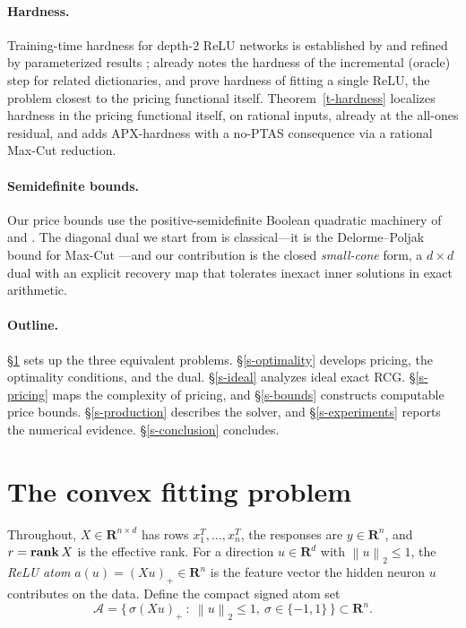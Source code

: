 \documentclass[12pt]{article}
\theoremstyle{plain}
\theoremstyle{definition}
\newcommand{\reals}{\mathbf{R}}
\newcommand{\A}{\mathcal{A}}
\newcommand{\norm}[1]{\left\lVert #1\right\rVert}
\newcommand{\relu}[1]{\left(#1\right)_+}
\newcommand{\rank}{\mathop{\bf rank}}
\begin{document}
\paragraph{Hardness.}
Training-time hardness for depth-2 ReLU networks is established by
\citet{goel2021tight} and refined by parameterized results
\citep{froese2022computational}; \citet{bach2017breaking} already notes the
hardness of the incremental (oracle) step for related dictionaries, and
\citet{boob2022complexity} prove hardness of fitting a single ReLU, the
problem closest to the pricing functional itself.
Theorem~\ref{t-hardness} localizes hardness in the pricing functional itself,
on rational inputs, already at the all-ones residual, and adds APX-hardness
with a no-PTAS consequence via a rational Max-Cut reduction.

\paragraph{Semidefinite bounds.}
Our price bounds use the positive-semidefinite Boolean quadratic machinery of
\citet{nesterov1998semidefinite} and \citet{goemans1995improved}. The diagonal
dual we start from is classical---it is the Delorme--Poljak bound for Max-Cut
\citep{delorme1993laplacian}---and our contribution is the closed
\emph{small-cone} form, a $d\times d$ dual with an explicit recovery map that
tolerates inexact inner solutions in exact arithmetic.

\paragraph{Outline.}
\S\ref{s-objective} sets up the three equivalent problems.
\S\ref{s-optimality} develops pricing, the optimality conditions, and the dual.
\S\ref{s-ideal} analyzes ideal exact RCG. \S\ref{s-pricing} maps the
complexity of pricing, and \S\ref{s-bounds} constructs computable price
bounds. \S\ref{s-production} describes the solver, and \S\ref{s-experiments}
reports the numerical evidence. \S\ref{s-conclusion} concludes.

\section{The convex fitting problem}\label{s-objective}

Throughout, $X\in\reals^{n\times d}$ has rows $x_1^T,\ldots,x_n^T$, the
responses are $y\in\reals^n$, and $r=\rank X$ is the effective rank. For a
direction $u\in\reals^d$ with $\norm u_2\le1$, the \emph{ReLU atom} $a(u)=
\relu{Xu}\in\reals^n$ is the feature vector the hidden neuron $u$ contributes
on the data. Define the compact signed atom set
\[
  \A=\{\,\sigma\relu{Xu}\ : \ \norm u_2\le1,\ \sigma\in\{-1,1\}\,\}
  \subset\reals^n .
\]
\end{document}

